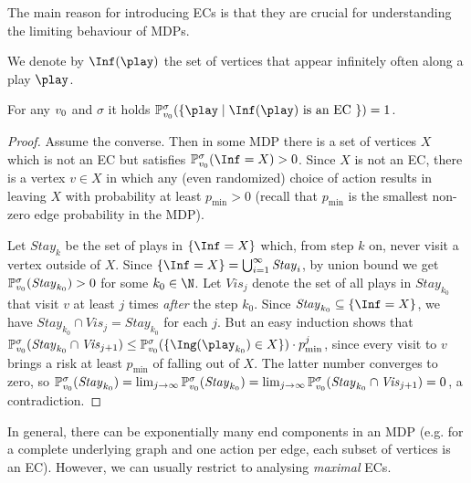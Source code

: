 The main reason for introducing ECs is that they are crucial for understanding the limiting behaviour of MDPs.

\begin{definition}
\label{5-def:inf}
We denote by $\Inf(\play)$ the set of vertices that appear infinitely often along a play $ \play $.
\end{definition}

\begin{lemma}
\label{5-lem:EC-inf}
For any $ v_0 $ and $ \sigma $ it holds $ \probm^\sigma_{\vinit} ( \{\play \mid \Inf(\play) \text{ is an EC }  \}) = 1 $. 
\end{lemma}
\begin{proof}
Assume the converse. Then in some MDP there is a set of vertices $ X $ which is not an EC but satisfies $ \probm^\sigma_{\vinit}(\Inf = X ) > 0 $. Since $ X $ is not an EC, there is a vertex $ v \in X $ in which any (even randomized) choice of action results in leaving $ X $ with probability at least $  p_{\min} > 0$ (recall that $ p_{\min} $ is the smallest non-zero edge probability in the MDP).

Let $ \mathit{Stay}_k $ be the set of plays in $\{\Inf = X \}$ which, from step $ k $ on, never visit a vertex outside of $ X $. Since $ \{\Inf = X \}  = \bigcup_{i=1}^{\infty} \mathit{Stay}_i$, by union bound we get $ \mathbb{P}^\sigma_{v_0}(\mathit{Stay}_{k_0})>0 $ for some  $ k_0\in \N $. Let $ \mathit{Vis}_j $ denote the set of all plays in $ \mathit{Stay}_{k_0} $ that visit $ v $ at least $ j $ times \emph{after} the step $ k_0 $. Since $  \mathit{Stay}_{k_0} \subseteq \{\Inf = X\}$, we have $  \mathit{Stay}_{k_0} \cap \mathit{Vis}_j = \mathit{Stay}_{k_0} $ for each $ j $. But an easy induction shows that  $ \probm_{\vinit}^\sigma (\mathit{Stay}_{k_0} \cap \mathit{Vis}_{j+1} ) \leq \probm_{\vinit}^\sigma(\{\Ing(\play_{k_0}) \in X \})\cdot p_{\min}^j$, since every visit to $ v $ brings a  risk at least $p_{\min}$ of falling out of $ X $. The latter number converges to zero, so $ \mathbb{P}_{v_0}^\sigma (\mathit{Stay}_{k_0}) = \lim_{j\rightarrow \infty}\mathbb{P}_{v_0}^\sigma (\mathit{Stay}_{k_0}) = \lim_{j\rightarrow \infty}\mathbb{P}_{v_0}^\sigma (\mathit{Stay}_{k_0} \cap\mathit{Vis}_{j+1}) =  0$, a contradiction.
\end{proof}

In general, there can be exponentially many end components in an MDP (e.g. for a complete underlying graph and one action per edge, each subset of vertices is an EC). However, we can usually restrict to analysing \emph{maximal} ECs.


